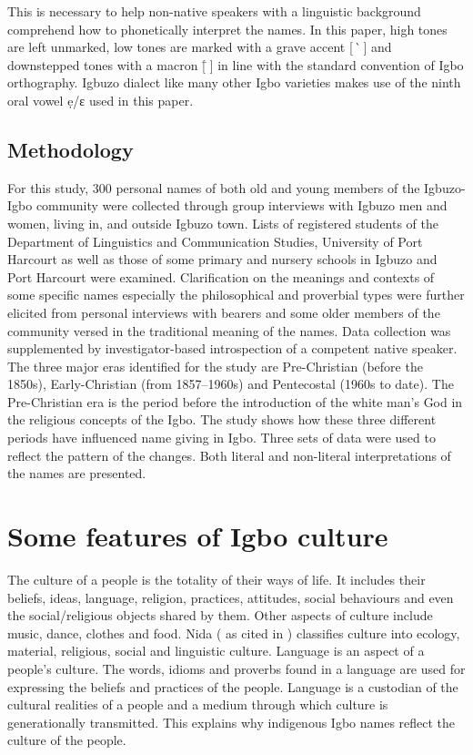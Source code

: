 \documentclass[output=paper]{langscibook}
\begin{document}
\noindent This is necessary to help non-native speakers with a linguistic background comprehend how to phonetically interpret the names. In this paper, high tones are left unmarked, low tones are marked with a grave accent [\,\`{}\,] and downstepped tones with
a macron [\,{\={}}\,] in line with the standard convention of Igbo orthography. Igbuzo dialect like many other Igbo varieties makes use of the ninth oral vowel ẹ/ɛ used in this paper.

\subsection{Methodology}\largerpage
For this study, 300 personal names of both old and young members of the Igbuzo-Igbo community were collected through group interviews with Igbuzo men and women, living in, and outside Igbuzo town. Lists of registered students of the Department of Linguistics and Communication Studies, University of Port Harcourt as well as those of some primary and nursery schools in Igbuzo and Port Harcourt were examined. Clarification on the meanings and contexts of some specific names especially the philosophical and proverbial types were further elicited from personal interviews with bearers and some older members of the community versed in the traditional meaning of the names. Data collection was supplemented by investigator-based introspection of a competent native speaker. The three major eras identified for the study are
Pre-Christian (before the 1850s),
Early-Christian (from 1857--1960s) and
Pentecostal (1960s to date). The Pre-Chris\-tian era is the period before the introduction of the white man’s God in the religious concepts of the Igbo. The study shows how these three different periods have influenced name giving in Igbo. Three sets of data were used to reflect the pattern of the changes. Both literal and non-literal interpretations of the names are presented.



\section{Some features of Igbo culture}
The culture of a people is the totality of their ways of life. It includes their beliefs, ideas, language, religion, practices, attitudes, social behaviours and even the social/religious objects shared by them. Other aspects of culture include music, dance, clothes and food. Nida (\citeyear{Nida1975} as cited in \citealt{Surukat2009}) classifies culture into ecology, material, religious, social and linguistic culture. Language is an aspect of a people’s culture. The words, idioms and proverbs found in a language are used for expressing the beliefs and practices of the people. Language is a custodian of the cultural realities of a people and a medium through which culture is generationally transmitted. This explains why indigenous Igbo names reflect the culture of the people.
\end{document}
